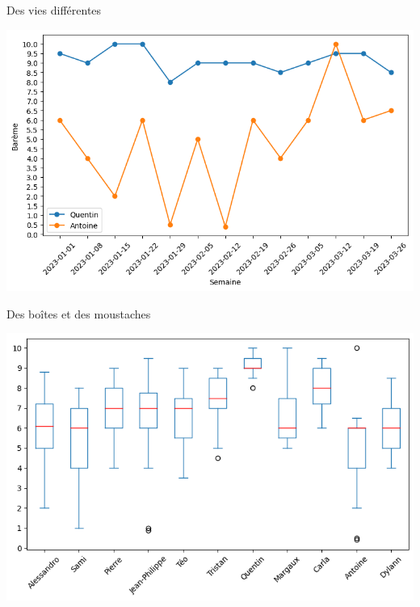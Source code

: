 \documentclass[svgnames]{beamer}
\begin{document}
\begin{frame}{Des vies différentes}

\includegraphics[width=\textwidth]{data/quentin_antoine.png}
    
\end{frame}

\begin{frame}{Des boîtes et des moustaches}

\includegraphics[width=\textwidth]{data/box_plot.png}
    
\end{frame}
\end{document}
